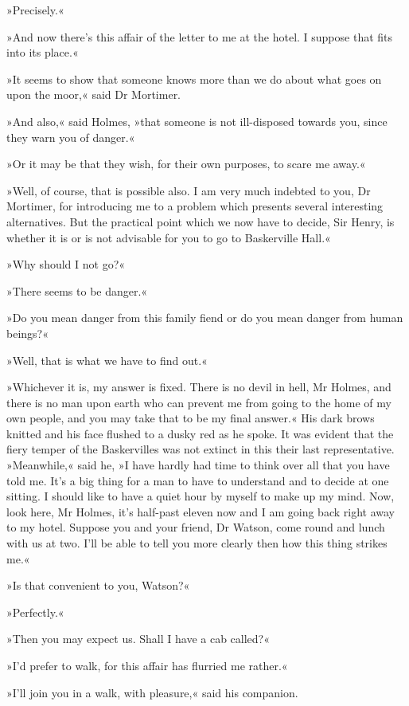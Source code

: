 »Precisely.«

»And now there's this affair of the letter to me at the hotel. I suppose that fits into its place.«

»It seems to show that someone knows more than we do about what goes on upon the moor,« said Dr Mortimer.

»And also,« said Holmes, »that someone is not ill-disposed towards you, since they warn you of danger.«

»Or it may be that they wish, for their own purposes, to scare me away.«

»Well, of course, that is possible also. I am very much indebted to you, Dr Mortimer, for introducing me to a problem which presents several interesting alternatives. But the practical point which we now have to decide, Sir Henry, is whether it is or is not advisable for you to go to Baskerville Hall.«

»Why should I not go?«

»There seems to be danger.«

»Do you mean danger from this family fiend or do you mean danger from human beings?«

»Well, that is what we have to find out.«

»Whichever it is, my answer is fixed. There is no devil in hell, Mr Holmes, and there is no man upon earth who can prevent me from going to the home of my own people, and you may take that to be my final answer.« His dark brows knitted and his face flushed to a dusky red as he spoke. It was evident that the fiery temper of the Baskervilles was not extinct in this their last representative. »Meanwhile,« said he, »I have hardly had time to think over all that you have told me. It's a big thing for a man to have to understand and to decide at one sitting. I should like to have a quiet hour by myself to make up my mind. Now, look here, Mr Holmes, it's half-past eleven now and I am going back right away to my hotel. Suppose you and your friend, Dr Watson, come round and lunch with us at two. I'll be able to tell you more clearly then how this thing strikes me.«

»Is that convenient to you, Watson?«

»Perfectly.«

»Then you may expect us. Shall I have a cab called?«

»I'd prefer to walk, for this affair has flurried me rather.«

»I'll join you in a walk, with pleasure,« said his companion.

